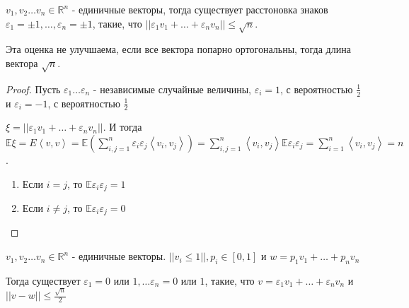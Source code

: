 \begin{theorem}
    
    $v_1, v_2 \ldots v_n \in \mathbb{R}^n$ - единичные векторы, тогда
    существует расстоновка знаков $\varepsilon_1 = \pm 1, \ldots, \varepsilon_n = \pm 1$,
    такие, что $||\varepsilon_1 v_1 + \ldots + \varepsilon_nv_n|| \leqslant \sqrt{n}$.

    \begin{remark}
        Эта оценка не улучшаема, если все вектора попарно ортогональны, тогда
        длина вектора $\sqrt{n}$.
    \end{remark}
\end{theorem}

\begin{proof}
    Пусть $\varepsilon_1 \ldots \varepsilon_n$ - независимые случайные величины, 
    $\varepsilon_i = 1$, с вероятностью $\frac{1}{2}$ и $\varepsilon_i = -1$, с вероятностью $\frac{1}{2}$

    $\xi = || \varepsilon_1 v_1 + \ldots + \varepsilon_nv_n || $. И тогда $\mathbb{E} \xi = E \left < v, v \right >  = 
    \mathbb{E} (\sum_{i, j = 1}^n \varepsilon_i \varepsilon_j \left < v_i, v_j \right >) = 
    \sum_{i, j = 1}^n \left < v_i, v_j \right > \mathbb{E} \varepsilon_i \varepsilon_j = 
    \sum_{i = 1}^n \left < v_i, v_j \right > = n$.

    \begin{enumerate}
        \item Если $i = j$, то $\mathbb{E} \varepsilon_i \varepsilon_j = 1$
        \item Если $i \neq j$, то $\mathbb{E}\varepsilon_i \varepsilon_j = 0$
    \end{enumerate}
\end{proof}

\begin{theorem}
    
    $v_1, v_2 \ldots v_n \in \mathbb{R}^n$ - единичные векторы. $|| v_i \leqslant 1||, p_i \in [0, 1] $ и 
    $w = p_1v_1 + \ldots + p_n v_n$
    
    Тогда существует $\varepsilon_1 = 0$ или $1, \ldots \varepsilon_n = 0$ или $1$, 
    такие, что $v = \varepsilon_1v_1 + \ldots + \varepsilon_nv_n$ и $|| v - w || \leqslant \frac{\sqrt{n}}{2}$ 
\end{theorem}
    
